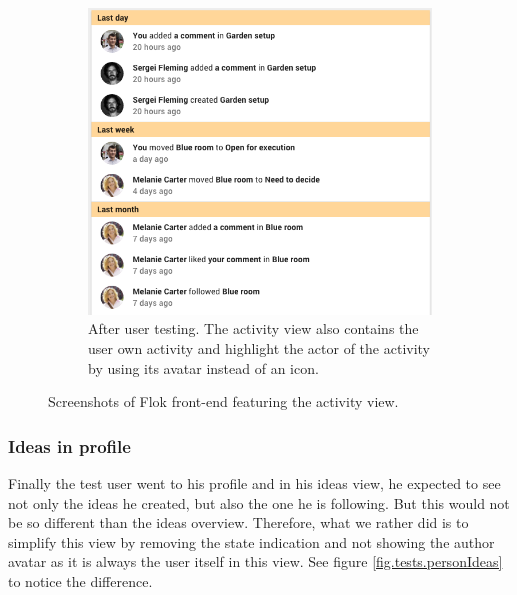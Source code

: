 \documentclass[a4paper,12pt,twoside]{article}
\begin{document}
\begin{figure}[!htb]
\begin{subfigure}[t]{.495\textwidth}
        \includegraphics[width=\textwidth]{images/user_tests/activity_after.png}
        \caption{After user testing. The activity view also contains the user own activity and highlight the actor of the activity by using its avatar instead of an icon.}
        \label{fig.tests.activity.after}
    \end{subfigure}
    \caption{Screenshots of Flok front-end featuring the activity view.}
    \label{fig.tests.activity}
\end{figure}

\subsubsection*{Ideas in profile}
Finally the test user went to his profile and in his ideas view, he expected to see not only the ideas he created, but also the one he is following.
But this would not be so different than the ideas overview.
Therefore, what we rather did is to simplify this view by removing the state indication and not showing the author avatar as it is always the user itself in this view.
See figure \ref{fig.tests.personIdeas} to notice the difference.
\end{document}
